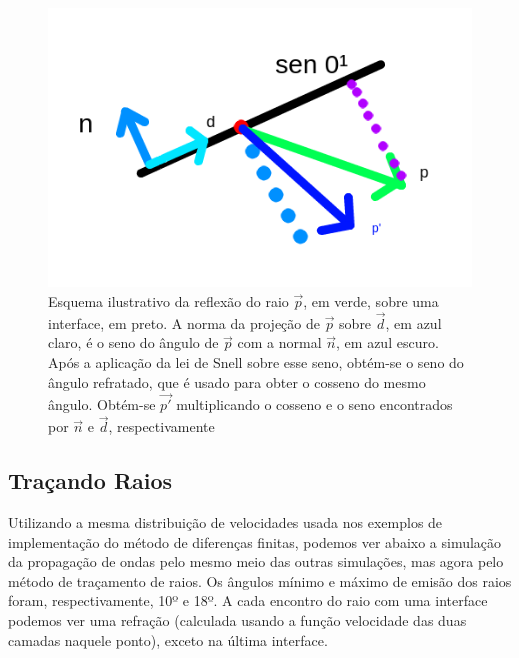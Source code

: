                 \begin{figure}[H]
                    \centering
                    \includegraphics[scale=.6]{imagens/RTimages/refract.png}
                    
                    \hrulefill
                    \caption{Esquema ilustrativo da reflexão do raio $\vec{p}$, em verde, sobre uma interface, em preto. A norma da projeção de $\vec{p}$ sobre $\vec{d}$, em azul claro, é o seno do ângulo de $\vec{p}$ com a normal $\vec{n}$, em azul escuro. Após a aplicação da lei de Snell sobre esse seno, obtém-se o seno do ângulo refratado, que é usado para obter o cosseno do mesmo ângulo. Obtém-se $\vec{p'}$ multiplicando o cosseno e o seno encontrados por $\vec{n}$ e $\vec{d}$, respectivamente}
                    \hrulefill
                    \label{fig:refract}
                \end{figure}
            
        \subsection{Traçando Raios}
        
	        Utilizando a mesma distribuição de velocidades usada nos exemplos de implementação do método de diferenças finitas, podemos ver abaixo a simulação da propagação de ondas pelo mesmo meio das outras simulações, mas agora pelo método de traçamento de raios. Os ângulos mínimo e máximo de emisão dos raios foram, respectivamente, 10º e 18º. A cada encontro do raio com uma interface podemos ver uma refração (calculada usando a função velocidade das duas camadas naquele ponto), exceto na última interface.
	        
